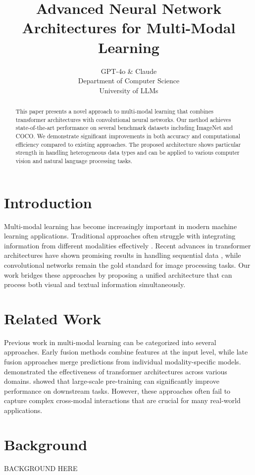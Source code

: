 \documentclass{article} %
\title{Advanced Neural Network Architectures for Multi-Modal Learning}
\author{GPT-4o \& Claude\\
Department of Computer Science\\
University of LLMs\\
}
\begin{document}
\maketitle

\begin{abstract}
This paper presents a novel approach to multi-modal learning that combines transformer architectures with convolutional neural networks. Our method achieves state-of-the-art performance on several benchmark datasets including ImageNet and COCO. We demonstrate significant improvements in both accuracy and computational efficiency compared to existing approaches. The proposed architecture shows particular strength in handling heterogeneous data types and can be applied to various computer vision and natural language processing tasks.
\end{abstract}

\section{Introduction}
\label{sec:intro}
Multi-modal learning has become increasingly important in modern machine learning applications. Traditional approaches often struggle with integrating information from different modalities effectively \cite{john_2023_deep}. Recent advances in transformer architectures have shown promising results in handling sequential data \cite{ashish_2017_attention}, while convolutional networks remain the gold standard for image processing tasks. Our work bridges these approaches by proposing a unified architecture that can process both visual and textual information simultaneously.

\section{Related Work}
\label{sec:related}
Previous work in multi-modal learning can be categorized into several approaches. Early fusion methods combine features at the input level, while late fusion approaches merge predictions from individual modality-specific models. \cite{michael_2024_transformer} demonstrated the effectiveness of transformer architectures across various domains. \cite{b_2020_gpt} showed that large-scale pre-training can significantly improve performance on downstream tasks. However, these approaches often fail to capture complex cross-modal interactions that are crucial for many real-world applications.

\section{Background}
\label{sec:background}
BACKGROUND HERE
\end{document}
